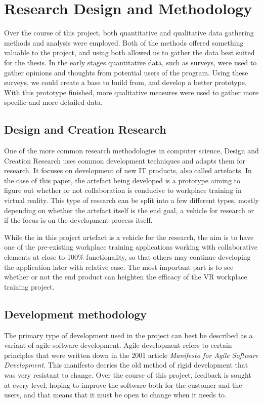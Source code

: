 
\chapter{Research Design and Methodology}
Over the course of this project, both quantitative and qualitative data gathering methods and analysis were employed. Both of the methods offered something valuable to the project, and using both allowed us to gather the data best suited for the thesis. In the early stages quantitative data, such as surveys, were used to gather opinions and thoughts from potential users of the program. Using these surveys, we could create a base to build from, and develop a better prototype. With this prototype finished, more qualitative measures were used to gather more specific and more detailed data.

\section{Design and Creation Research}
\label{sec:designCreationResearch}
One of the more common research methodologies in computer science, Design and Creation Research uses common development techniques and adapts them for research. It focuses on development of new IT products, also called artefacts\cite{oates2005researching}. In the case of this paper, the artefact being developed is a prototype aiming to figure out whether or not collaboration is conducive to workplace training in virtual reality. This type of research can be split into a few different types, mostly depending on whether the artefact itself is the end goal, a vehicle for research or if the focus is on the development process itself. 

While the in this project artefact is a vehicle for the research, the aim is to have one of the pre-existing workplace training applications working with collaborative elements at close to 100\% functionality, so that others may continue developing the application later with relative ease. The most important part is to see whether or not the end product can heighten the efficacy of the VR workplace training project.


\section{Development methodology}
The primary type of development used in the project can best be described as a variant of agile software development. Agile development refers to certain principles that were written down in the 2001 article \textit{Manifesto for Agile Software Development}\cite{beck2001manifesto}. This manifesto decries the old method of rigid development that was very resistant to change. Over the course of this project, feedback is sought at every level, hoping to improve the software both for the customer and the users, and that means that it must be open to change when it needs to.

